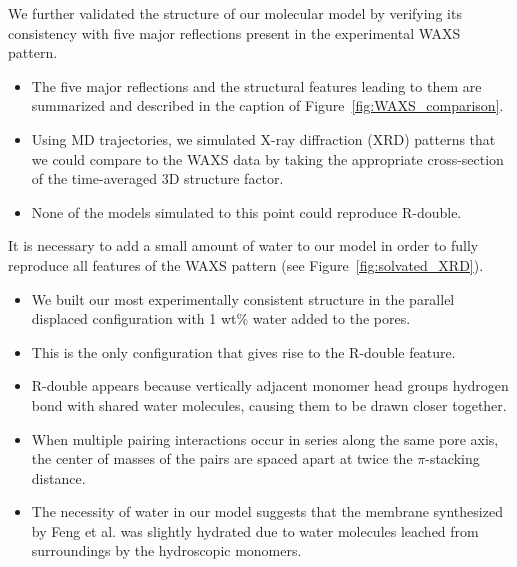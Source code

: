 \documentclass{article}
\begin{document}
  \noindent We further validated the structure of our molecular model by 
  verifying its consistency with five major reflections present in the 
  experimental WAXS pattern.
  \begin{itemize}
    \item The five major reflections and the structural features leading
    to them are summarized and described in the caption of Figure~\ref{fig:WAXS_comparison}.
    \item Using MD trajectories, we simulated X-ray diffraction (XRD) 
    patterns that we could compare to the WAXS data by taking the 
    appropriate cross-section of the time-averaged 3D structure factor. 
    \item None of the models simulated to this point could reproduce R-double.   
  \end{itemize}   
  
  \noindent It is necessary to add a small amount of water to our model in
  order to fully reproduce all features of the WAXS pattern (see 
  Figure~\ref{fig:solvated_XRD}).
  \begin{itemize}
    \item We built our most experimentally consistent structure in the 
    parallel displaced configuration with 1 wt\% water added to the 
    pores. 
    \item This is the only configuration that gives rise to the 
    R-double feature. 
    \item R-double appears because vertically adjacent monomer head groups
    hydrogen bond with shared water molecules, causing them to be drawn 
    closer together.
    \item When multiple pairing interactions occur in series along the 
    same pore axis, the center of masses of the pairs are spaced apart at 
    twice the $\pi$-stacking distance. 
    \item The necessity of water in our model suggests that the membrane
    synthesized by Feng et al. was slightly hydrated due to water molecules
    leached from surroundings by the hydroscopic monomers. 
  \end{itemize}
  
\end{document}
